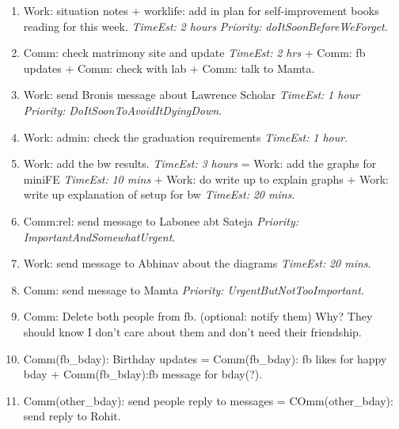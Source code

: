 \documentclass[11pt]{article}
\newcommand{\te}[1]{\textit{TimeEst:} \textit{#1}}
\newcommand{\priority}[1]{\textit{Priority:} \textit{#1}}
\newcommand{\prio}[1]{\textit{Priority:} \textit{#1}}
\begin{document}
\begin{enumerate}
\item Work: situation notes + worklife: add in plan for
  self-improvement books reading for this week.  \te{2 hours}
  \prio{doItSoonBeforeWeForget}. 

\item Comm: check matrimony site and update \te{2 hrs}  + Comm: fb
  updates + Comm: check with lab + Comm: talk to Mamta. 

\item Work: send Bronis message about Lawrence Scholar \te{1 hour}
  \prio{DoItSoonToAvoidItDyingDown}. 

\item Work: admin: check the graduation requirements \te{1 hour}.

\item Work: add the bw results. \te{3 hours}  =  Work: add the graphs
  for miniFE \te{10 mins}   +  Work: do write up to explain graphs +
  Work: write up explanation of setup for bw  \te{20 mins}. 

\item Comm:rel: send message to Labonee abt Sateja
  \priority{ImportantAndSomewhatUrgent}. 

\item Work: send message to Abhinav about the diagrams \te{20 mins}. 

\item Comm: send message to Mamta \priority{UrgentButNotTooImportant}. 

\item Comm: Delete both people from fb. (optional: notify them) Why?
 They should know I don't care about them and don't need their friendship. 

\item Comm(fb\_bday): Birthday updates = Comm(fb\_bday): fb likes for happy bday  + Comm(fb\_bday):fb message for bday(?). 
\item Comm(other\_bday): send people reply to messages = COmm(other\_bday): send reply to Rohit. 
\end{enumerate}
 
           \newpage
           
\end{document}
